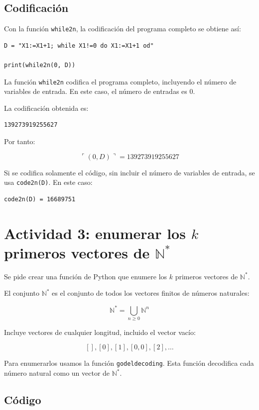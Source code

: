 \documentclass[10pt]{article}
\begin{document}
\subsection{Codificación}

Con la función \texttt{while2n}, la codificación del programa completo se obtiene así:

\begin{verbatim}
D = "X1:=X1+1; while X1!=0 do X1:=X1+1 od"

print(while2n(0, D))
\end{verbatim}

La función \texttt{while2n} codifica el programa completo, incluyendo el número de variables de entrada. En este caso, el número de entradas es $0$.

La codificación obtenida es:

\begin{verbatim}
139273919255627
\end{verbatim}

Por tanto:

\[
    \ulcorner (0,D) \urcorner = 139273919255627
\]

Si se codifica solamente el código, sin incluir el número de variables de entrada, se usa \texttt{code2n(D)}. En este caso:

\begin{verbatim}
code2n(D) = 16689751
\end{verbatim}

\section{Actividad 3: enumerar los $k$ primeros vectores de $\mathbb{N}^*$}

Se pide crear una función de Python que enumere los $k$ primeros vectores de $\mathbb{N}^*$.

El conjunto $\mathbb{N}^*$ es el conjunto de todos los vectores finitos de números naturales:

\[
    \mathbb{N}^* = \bigcup_{n \geq 0} \mathbb{N}^n
\]

Incluye vectores de cualquier longitud, incluido el vector vacío:

\[
    [], [0], [1], [0,0], [2], \dots
\]

Para enumerarlos usamos la función \texttt{godeldecoding}. Esta función decodifica cada número natural como un vector de $\mathbb{N}^*$.

\subsection{Código}
\end{document}

